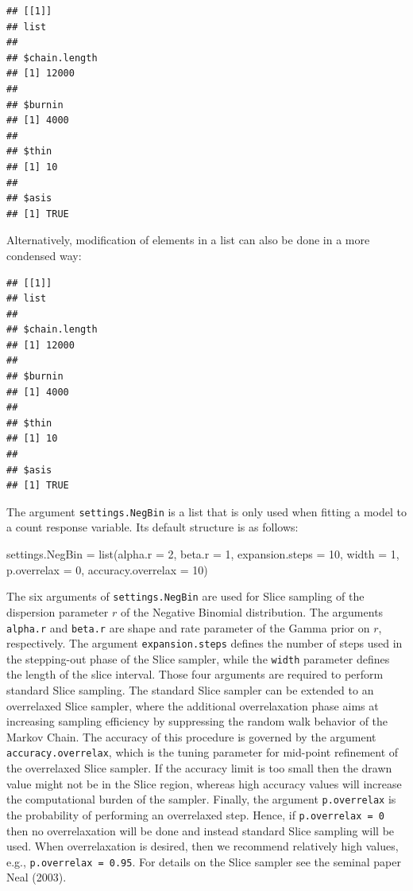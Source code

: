 \documentclass[a4paper, preprint, 3p,
authoryear]{elsarticle} %
\newenvironment{Shaded}{\begin{snugshade}}{\end{snugshade}}
\newcommand{\NormalTok}[1]{#1}
\begin{document}
\begin{verbatim}
## [[1]]
## list
## 
## $chain.length
## [1] 12000
## 
## $burnin
## [1] 4000
## 
## $thin
## [1] 10
## 
## $asis
## [1] TRUE
\end{verbatim}

Alternatively, modification of elements in a list can also be done in a
more condensed way:

\begin{Shaded}
\end{Shaded}

\begin{verbatim}
## [[1]]
## list
## 
## $chain.length
## [1] 12000
## 
## $burnin
## [1] 4000
## 
## $thin
## [1] 10
## 
## $asis
## [1] TRUE
\end{verbatim}

The argument \texttt{settings.NegBin} is a list that is only used when
fitting a model to a count response variable. Its default structure is
as follows:

\begin{Shaded}
\begin{Highlighting}[]
\NormalTok{settings.NegBin = list(alpha.r = 2, beta.r = 1, expansion.steps = 10,               }
\NormalTok{                       width = 1, p.overrelax = 0, accuracy.overrelax = 10)}
\end{Highlighting}
\end{Shaded}

The six arguments of \texttt{settings.NegBin} are used for Slice
sampling of the dispersion parameter \(r\) of the Negative Binomial
distribution. The arguments \texttt{alpha.r} and \texttt{beta.r} are
shape and rate parameter of the Gamma prior on \(r\), respectively. The
argument \texttt{expansion.steps} defines the number of steps used in
the stepping-out phase of the Slice sampler, while the \texttt{width}
parameter defines the length of the slice interval. Those four arguments
are required to perform standard Slice sampling. The standard Slice
sampler can be extended to an overrelaxed Slice sampler, where the
additional overrelaxation phase aims at increasing sampling efficiency
by suppressing the random walk behavior of the Markov Chain. The
accuracy of this procedure is governed by the argument
\texttt{accuracy.overrelax}, which is the tuning parameter for mid-point
refinement of the overrelaxed Slice sampler. If the accuracy limit is
too small then the drawn value might not be in the Slice region, whereas
high accuracy values will increase the computational burden of the
sampler. Finally, the argument \texttt{p.overrelax} is the probability
of performing an overrelaxed step. Hence, if \texttt{p.overrelax = 0}
then no overrelaxation will be done and instead standard Slice sampling
will be used. When overrelaxation is desired, then we recommend
relatively high values, e.g., \texttt{p.overrelax = 0.95}. For details
on the Slice sampler see the seminal paper Neal (2003).
\end{document}
